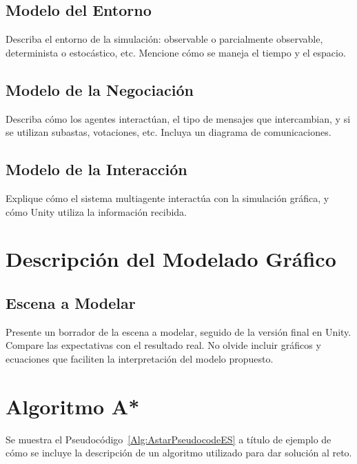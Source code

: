 \documentclass[sjournal]{IEEEtran}
\begin{document}
\subsection{Modelo del Entorno}
Describa el entorno de la simulación: observable o parcialmente observable, determinista o estocástico, etc. Mencione cómo se maneja el tiempo y el espacio.

\subsection{Modelo de la Negociación}
Describa cómo los agentes interactúan, el tipo de mensajes que intercambian, y si se utilizan subastas, votaciones, etc. Incluya un diagrama de comunicaciones.

\subsection{Modelo de la Interacción}
Explique cómo el sistema multiagente interactúa con la simulación gráfica, y cómo Unity utiliza la información recibida.

\section{Descripción del Modelado Gráfico}
\subsection{Escena a Modelar}
Presente un borrador de la escena a modelar, seguido de la versión final en Unity. Compare las expectativas con el resultado real. No olvide incluir gráficos y ecuaciones que faciliten la interpretación del modelo propuesto.

\section{Algoritmo A*}

Se muestra el Pseudocódigo~\ref{Alg:AstarPseudocodeES} a título de ejemplo de cómo se incluye la descripción de un algoritmo utilizado para dar solución al reto.
\end{document}
